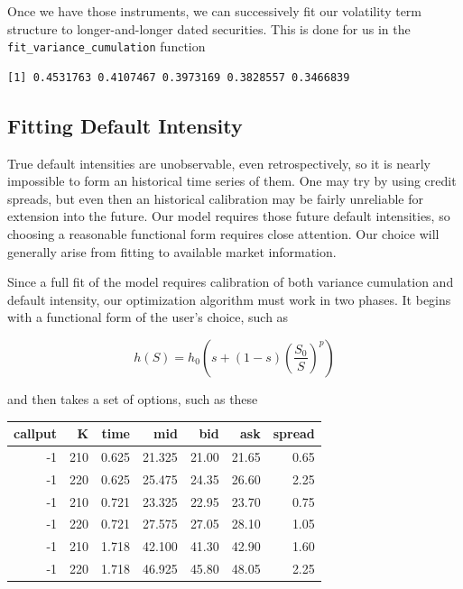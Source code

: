 \documentclass[]{article}
\newenvironment{Shaded}{\begin{snugshade}}{\end{snugshade}}
\newcommand{\DataTypeTok}[1]{\textcolor[rgb]{0.13,0.29,0.53}{#1}}
\newcommand{\DecValTok}[1]{\textcolor[rgb]{0.00,0.00,0.81}{#1}}
\newcommand{\FloatTok}[1]{\textcolor[rgb]{0.00,0.00,0.81}{#1}}
\newcommand{\KeywordTok}[1]{\textcolor[rgb]{0.13,0.29,0.53}{\textbf{#1}}}
\newcommand{\NormalTok}[1]{#1}
\newcommand{\OperatorTok}[1]{\textcolor[rgb]{0.81,0.36,0.00}{\textbf{#1}}}
\newcommand{\OtherTok}[1]{\textcolor[rgb]{0.56,0.35,0.01}{#1}}
\newcommand{\StringTok}[1]{\textcolor[rgb]{0.31,0.60,0.02}{#1}}
\begin{document}
Once we have those instruments, we can successively fit our volatility
term structure to longer-and-longer dated securities. This is done for
us in the \texttt{fit\_variance\_cumulation} function

\begin{Shaded}
\end{Shaded}

\begin{verbatim}
[1] 0.4531763 0.4107467 0.3973169 0.3828557 0.3466839
\end{verbatim}

\hypertarget{fitting-default-intensity}{%
\subsection{Fitting Default Intensity}\label{fitting-default-intensity}}

True default intensities are unobservable, even retrospectively, so it
is nearly impossible to form an historical time series of them. One may
try by using credit spreads, but even then an historical calibration may
be fairly unreliable for extension into the future. Our model requires
those future default intensities, so choosing a reasonable functional
form requires close attention. Our choice will generally arise from
fitting to available market information.

Since a full fit of the model requires calibration of both variance
cumulation and default intensity, our optimization algorithm must work
in two phases. It begins with a functional form of the user's choice,
such as

\[
h(S) = h_0 \left(  s+(1-s)  \left( \frac{S_0}{S} \right)^p  \right)
\]

and then takes a set of options, such as these

\begin{longtable}[]{@{}rrrrrrr@{}}
\toprule
callput & K & time & mid & bid & ask & spread\tabularnewline
\midrule
\endhead
-1 & 210 & 0.625 & 21.325 & 21.00 & 21.65 & 0.65\tabularnewline
-1 & 220 & 0.625 & 25.475 & 24.35 & 26.60 & 2.25\tabularnewline
-1 & 210 & 0.721 & 23.325 & 22.95 & 23.70 & 0.75\tabularnewline
-1 & 220 & 0.721 & 27.575 & 27.05 & 28.10 & 1.05\tabularnewline
-1 & 210 & 1.718 & 42.100 & 41.30 & 42.90 & 1.60\tabularnewline
-1 & 220 & 1.718 & 46.925 & 45.80 & 48.05 & 2.25\tabularnewline
\bottomrule
\end{longtable}
\end{document}
